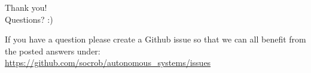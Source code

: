 \documentclass{beamer}
\begin{document}

%	
%	


\begin{frame}
\begin{LARGE}
\begin{center}
Thank you!\\

Questions? :)\\

\vspace*{1cm}

\footnotesize
If you have a question please create a Github issue so that we can all benefit from the posted answers under:
\\
\url{https://github.com/socrob/autonomous\_systems/issues}

\vspace*{2cm}
\end{center}
\end{LARGE}
\end{frame}

\end{document}
